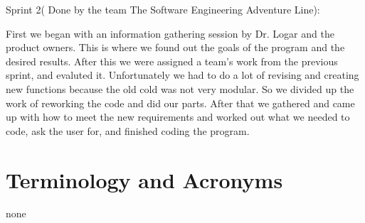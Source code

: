 Sprint 2( Done by the team The Software Engineering Adventure Line):

First we began with an information gathering session by Dr. Logar and the product owners. This is where we
found out the goals of the program and the desired results. After this we were assigned a team's work
from the previous sprint, and evaluted it. Unfortunately we had to do a lot of revising and creating new
functions because the old cold was not very modular. So we divided up the work of reworking the code and
did our parts. After that we gathered and came up with how to meet the new requirements and worked out
what we needed to code, ask the user for, and finished coding the program.

\section{Terminology and Acronyms}
none
